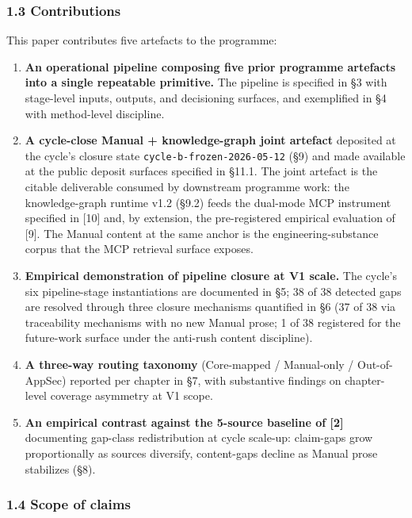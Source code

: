 \documentclass[
]{article}
\providecommand{\tightlist}{%
  \setlength{\itemsep}{0pt}\setlength{\parskip}{0pt}}
\begin{document}
\subsubsection{1.3 Contributions}\label{contributions}

This paper contributes five artefacts to the programme:

\begin{enumerate}
\def\labelenumi{\arabic{enumi}.}
\tightlist
\item
  \textbf{An operational pipeline composing five prior programme
  artefacts into a single repeatable primitive.} The pipeline is
  specified in §3 with stage-level inputs, outputs, and decisioning
  surfaces, and exemplified in §4 with method-level discipline.
\item
  \textbf{A cycle-close Manual + knowledge-graph joint artefact}
  deposited at the cycle's closure state
  \texttt{cycle-b-frozen-2026-05-12} (§9) and made available at the
  public deposit surfaces specified in §11.1. The joint artefact is the
  citable deliverable consumed by downstream programme work: the
  knowledge-graph runtime v1.2 (§9.2) feeds the dual-mode MCP instrument
  specified in {[}10{]} and, by extension, the pre-registered empirical
  evaluation of {[}9{]}. The Manual content at the same anchor is the
  engineering-substance corpus that the MCP retrieval surface exposes.
\item
  \textbf{Empirical demonstration of pipeline closure at V1 scale.} The
  cycle's six pipeline-stage instantiations are documented in §5; 38 of
  38 detected gaps are resolved through three closure mechanisms
  quantified in §6 (37 of 38 via traceability mechanisms with no new
  Manual prose; 1 of 38 registered for the future-work surface under the
  anti-rush content discipline).
\item
  \textbf{A three-way routing taxonomy} (Core-mapped / Manual-only /
  Out-of-AppSec) reported per chapter in §7, with substantive findings
  on chapter-level coverage asymmetry at V1 scope.
\item
  \textbf{An empirical contrast against the 5-source baseline of
  {[}2{]}} documenting gap-class redistribution at cycle scale-up:
  claim-gaps grow proportionally as sources diversify, content-gaps
  decline as Manual prose stabilizes (§8).
\end{enumerate}

\subsubsection{1.4 Scope of claims}\label{scope-of-claims}
\end{document}

